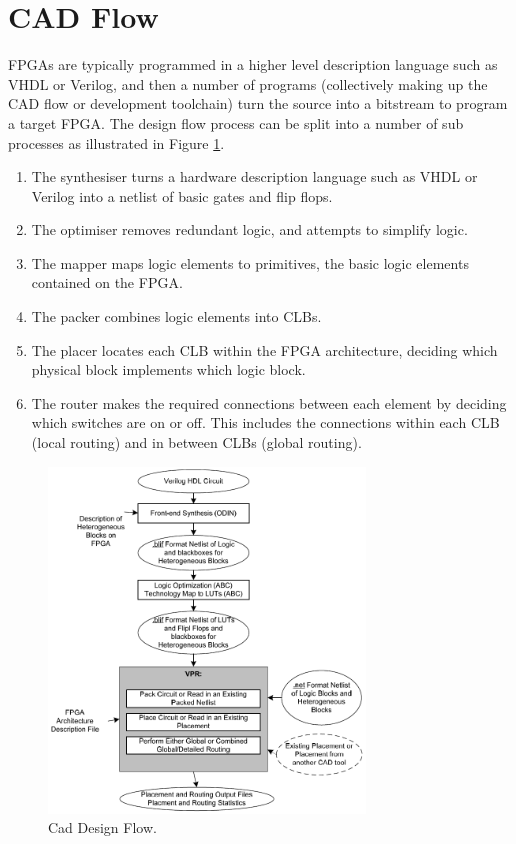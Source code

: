 \documentclass[12pt,final,oneside]{dwThesis} %
\begin{document}
\section{\acs{CAD} Flow}
\acp{FPGA} are typically programmed in a higher level description language such as VHDL or Verilog, and then a number of programs (collectively making up the \ac{CAD} flow or development toolchain) turn the source into a bitstream to program a target \ac{FPGA}.
The design flow process can be split into a number of sub processes as illustrated in Figure \ref{CADFlow}\cite{VPRBook,VPRManual,FPGAArch}.
\begin{enumerate}
    \item The synthesiser turns a hardware description language such as VHDL or Verilog into a netlist of basic gates and flip flops.
    \item The optimiser removes redundant logic, and attempts to simplify logic.
    \item The mapper maps logic elements to primitives, the basic logic elements contained on the \ac{FPGA}.
    \item The packer combines logic elements into \acp{CLB}.
    \item The placer locates each \ac{CLB} within the \ac{FPGA} architecture, deciding which physical block implements which logic block.
    \item The router makes the required connections between each element by deciding which switches are on or off. This includes the connections within each \ac{CLB} (local routing) and in between \acp{CLB} (global routing).
\end{enumerate}

\begin{figure}
    \begin{center}
        \includegraphics[width=0.75\textwidth]{images/vpr-cad.png}
        \caption{Cad Design Flow.\cite{VPRManual}}
        \label{CADFlow}
    \end{center}
\end{figure}
\end{document}
